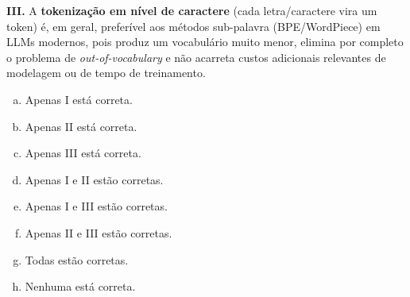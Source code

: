 \documentclass[11pt,a4paper]{article}
\begin{document}
\begin{enumerate}[1)]
\textbf{III.} A \textbf{tokenização em nível de caractere} (cada letra/caractere vira um token) é, em geral, preferível aos métodos sub-palavra (BPE/WordPiece) em LLMs modernos, pois produz um vocabulário muito menor, elimina por completo o problema de \textit{out-of-vocabulary} e não acarreta custos adicionais relevantes de modelagem ou de tempo de treinamento.

\begin{enumerate}[a)]
    \item Apenas I está correta.
    \item Apenas II está correta.
    \item Apenas III está correta.
    \item Apenas I e II estão corretas.
    \item Apenas I e III estão corretas.
    \item Apenas II e III estão corretas.
    \item Todas estão corretas.
    \item Nenhuma está correta.
\end{enumerate}


\end{enumerate}
\end{document}
